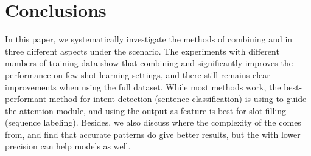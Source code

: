 \section{Conclusions}
In this paper, we systematically investigate the methods of combining \NN and \RE in three different aspects under the \SLU scenario. The experiments with different numbers of training data show that combining \NN and \RE significantly improves the performance on few-shot learning settings, and there still remains clear improvements when using the full dataset. While most methods work, the best-performant method for intent detection (sentence classification) is using \RE to guide the attention module, and using the \RE output as feature is best for slot filling (sequence labeling). Besides, we also discuss where the complexity of the \RE comes from, and find that accurate \RE patterns do give better results, but the \REs with lower precision can help \NN models as well.